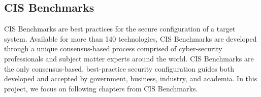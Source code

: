 \subsection*{CIS Benchmarks}
CIS Benchmarks are best practices for the secure configuration of a target system. Available for more than 140 technologies, CIS Benchmarks are developed through a unique consensus-based process comprised of cyber-security professionals and subject matter experts around the world. CIS Benchmarks are the only consensus-based, best-practice security configuration guides both developed and accepted by government, business, industry, and academia. In this project, we focus on following chapters from CIS Benchmarks.



